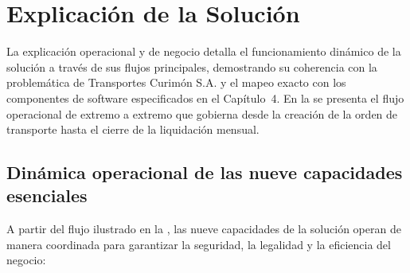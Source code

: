 \section{Explicación de la Solución}\label{sec:3-explicacion-solucion}

La explicación operacional y de negocio detalla el funcionamiento dinámico de la solución a través de sus flujos
principales, demostrando su coherencia con la problemática de Transportes Curimón S.A. y el mapeo exacto con los
componentes de software especificados en el Capítulo~4.
En la  se presenta el flujo operacional de extremo a extremo que gobierna desde la
creación de la orden de transporte hasta el cierre de la liquidación mensual.


\subsection{Dinámica operacional de las nueve capacidades esenciales}\label{sec:3-capacidades-operacionales}

A partir del flujo ilustrado en la , las nueve capacidades de la solución operan
de manera coordinada para garantizar la seguridad, la legalidad y la eficiencia del negocio:

